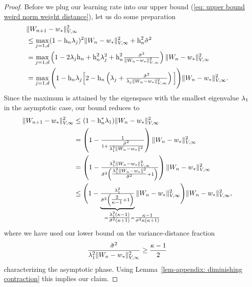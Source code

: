 \begin{proof}
	Before we plug our learning rate into our upper bound (\ref{eq: upper bound
	weird norm weight distance}), let us do some preparation 
	\begin{align}
		\nonumber
		&\|W_{n+1} -w_*\|_{V,\infty}^2\\
		\nonumber
		&\le \max_{j=1,d} (1-\text{h}_n\lambda_j)^2\|W_n -w_*\|_{V,\infty}^2
		+ \text{h}_n^2 \tilde{\sigma}^2\\
		\label{eq: upper bound useful for rate of convergence}
		&= \max_{j=1,d}\left(1- 2\lambda_j\text{h}_n + \text{h}_n^2\lambda_j^2
			+\text{h}_n^2\tfrac{\tilde{\sigma}^2}{\|W_n-w_*\|_{V,\infty}^2}
		\right)\|W_n-w_*\|_{V,\infty}^2\\
		\nonumber
		&= \max_{j=1,d}\Bigg(1- \text{h}_n \lambda_j\Big[2 - \text{h}_n \left(
			\lambda_j + \tfrac{\tilde{\sigma}^2}{\lambda_j\|W_n-w_*\|_{V,\infty}^2}
		\right)\Big] \Bigg)\|W_n-w_*\|_{V,\infty}^2.
	\end{align}
	Since the maximum is attained by the eigenspace with the smallest eigenvalue \(\lambda_1\)
	in the asymptotic case, our bound reduces to
	\begin{align*}
		\|\Weights_{n+1} -\minimum\|_{V,\infty}^2
		&\le (1- \lr_n^* \hesseEV_1)\|\Weights_n-\minimum\|_{V,\infty}^2\\
		&= \left(1- \tfrac{1}{1+ \tfrac{\tilde{\stdBound}^2}{\hesseEV_1^2\|\Weights_n-\minimum\|^2}}\right)
		\|\Weights_n-\minimum\|_{V,\infty}^2\\
		&= \left(1- \tfrac{
			\hesseEV_1^2 \|\Weights_n-\minimum\|_{V,\infty}^2
		}{
			\tilde{\stdBound}^2
			\left(\tfrac{\hesseEV_1^2\|\Weights_n-\minimum\|^2}{\tilde{\stdBound}^2}+1\right)
		}\right)
		\|\Weights_n-\minimum\|_{V,\infty}^2\\
		&\le \Bigg(
		1- \underbrace{\tfrac{
			\hesseEV_1^2
		}{
			\tilde{\stdBound}^2
			\left(\tfrac{2}{\condition -1}+1\right)
		}}_{
			=\tfrac{\hesseEV_1^2(\condition-1)}{\tilde{\stdBound}^2(\condition+1)}
			\mathrlap{=\tfrac{\condition-1}{\stdBound^2\condition(\condition+1)}}
		}
		\|\Weights_n-\minimum\|_{V,\infty}^2
		\Bigg)
		\|\Weights_n-\minimum\|_{V,\infty}^2,
	\end{align*}
	where we have used our lower bound on the variance-distance fraction
	\begin{align*}
		\frac{\tilde{\sigma}^2}{
			\lambda_1^2\|W_n-w_*\|_{V,\infty}^2
		}
		\ge \frac{\kappa-1}{2}
	\end{align*}
	characterizing the asymptotic phase. Using Lemma~\ref{lem-appendix: diminishing contraction}
	this implies our claim.


\end{proof}
